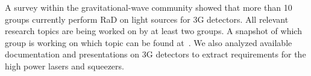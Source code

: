 

A survey within the gravitational-wave community showed that more than 10 groups currently perform \ac{RaD} on light sources for \ac{3G}   detectors. All relevant research topics are being worked on by at least two groups. A snapshot of which group is working on which topic can be found at~\cite{LightSource_RD_table}. We also analyzed available documentation and presentations on \ac{3G}   detectors to extract requirements for the high power lasers and squeezers.

